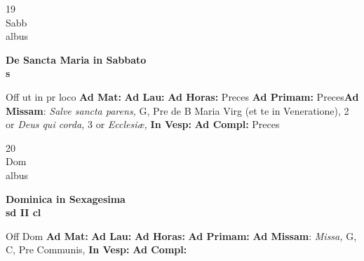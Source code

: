 \documentclass[10pt, openany]{book}
\begin{document}
        \begin{center}
            \begin{minipage}{3.5in}
                \vspace{2em}
                \begin{minipage}{0.5in}
                    {\Huge 19} \\
                    {\normalsize Sabb} \\
                    {\normalsize albus}
                \end{minipage}
                \begin{minipage}{3.0in}
                    \textbf{ \large De Sancta Maria in Sabbato \\
                    \textnormal{\normalsize s}} \\ 
                \end{minipage}
                \begin{justify}Off ut in pr loco
                    \textbf{Ad Mat: }
                    \textbf{Ad Lau: }
                    \textbf{Ad Horas: }Preces
                    \textbf{Ad Primam: }Preces\textbf{Ad Missam}: \textit{Salve sancta parens,} G, Pre de B Maria Virg (et te in Veneratione), 2 or \textit{Deus qui corda,} 3 or \textit{Ecclesiæ,}  
                    \textbf{In Vesp: }
                    \textbf{Ad Compl: }Preces
                \end{justify}
            \end{minipage}
        \end{center}
    
        \begin{center}
            \begin{minipage}{3.5in}
                \vspace{2em}
                \begin{minipage}{0.5in}
                    {\Huge 20} \\
                    {\normalsize Dom} \\
                    {\normalsize albus}
                \end{minipage}
                \begin{minipage}{3.0in}
                    \textbf{ \large Dominica in Sexagesima \\
                    \textnormal{\normalsize sd II cl}} \\ 
                \end{minipage}
                \begin{justify}Off Dom
                    \textbf{Ad Mat: }
                    \textbf{Ad Lau: }
                    \textbf{Ad Horas: }
                    \textbf{Ad Primam: }\textbf{Ad Missam}: \textit{Missa,} G, C, Pre Communis,  
                    \textbf{In Vesp: }
                    \textbf{Ad Compl: }
                \end{justify}
            \end{minipage}
        \end{center}
    
\end{document}
